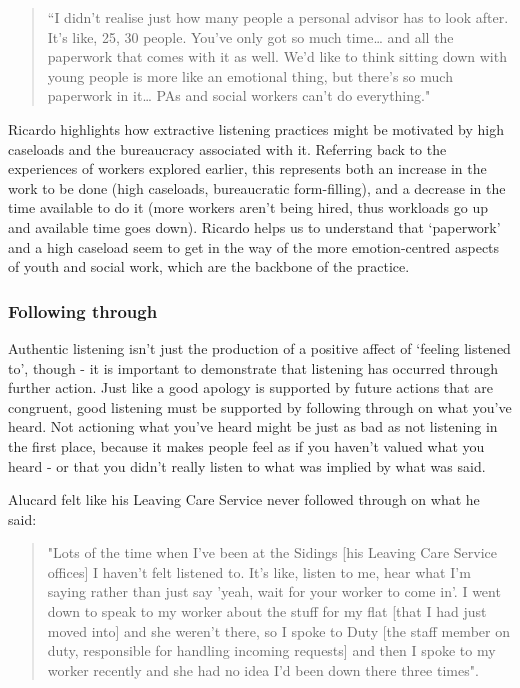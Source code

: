\begin{quote}
“I didn’t realise just how many people a personal advisor has to look after. It’s like, 25, 30 people. You’ve only got so much time… and all the paperwork that comes with it as well. We’d like to think sitting down with young people is more like an emotional thing, but there’s so much paperwork in it… PAs and social workers can’t do everything."
\end{quote}

Ricardo highlights how extractive listening practices might be motivated by high caseloads and the bureaucracy associated with it. Referring back to the experiences of workers explored earlier, this represents both an increase in the work to be done (high caseloads, bureaucratic form-filling), and a decrease in the time available to do it (more workers aren’t being hired, thus workloads go up and available time goes down).  Ricardo helps us to understand that ‘paperwork’ and a high caseload seem to get in the way of the more emotion-centred aspects of youth and social work, which are the backbone of the practice. 

\subsubsection{Following through}
Authentic listening isn’t just the production of a positive affect of ‘feeling listened to’, though - it is important to demonstrate that listening has occurred through further action. Just like a good apology is supported by future actions that are congruent, good listening must be supported by following through on what you’ve heard. Not actioning what you’ve heard might be just as bad as not listening in the first place, because it makes people feel as if you haven't valued what you heard - or that you didn't really listen to what was implied by what was said.

Alucard felt like his Leaving Care Service never followed through on what he said:

\begin{quote}
"Lots of the time when I've been at the Sidings [his Leaving Care Service offices] I haven't felt listened to. It's like, listen to me, hear what I'm saying rather than just say 'yeah, wait for your worker to come in'. I went down to speak to my worker about the stuff for my flat [that I had just moved into] and she weren't there, so I spoke to Duty [the staff member on duty, responsible for handling incoming requests] and then I spoke to my worker recently and she had no idea I'd been down there three times".
\end{quote}

